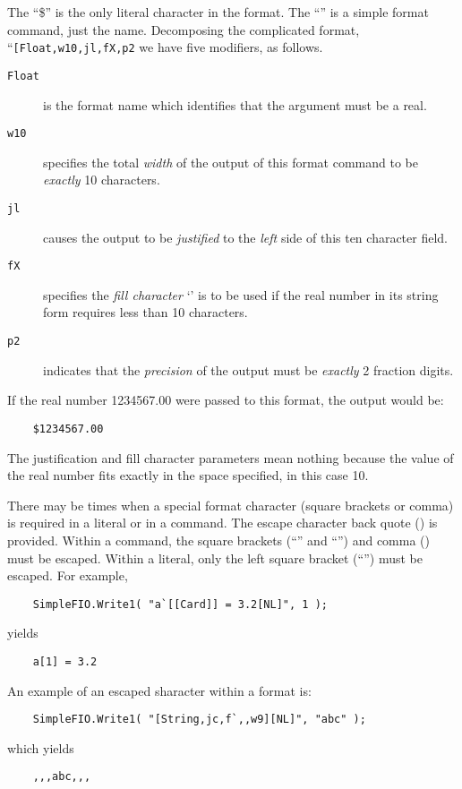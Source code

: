 The ``\$'' is the only literal character in the format.  The ``\code{[NL]}''
is a simple format command, just the name.  Decomposing the complicated format,
``{\tt [Float,w10,jl,fX,p2}
we have five modifiers, as follows.
\begin{description}
\item[{\tt Float}]   is the format name which identifies that the argument
            must be a real.
            
\item[{\tt w10}]    specifies the total {\em width} of the output of this 
            format command to be {\em exactly} 10 characters.
            
\item[{\tt jl}]     causes the output to be {\em justified } to the {\em left}
            side of this ten character field.
            
\item[{\tt fX}]     specifies the {\em fill character} `' is to be
            used if the real number in its string form requires less than
	    10 characters.
            
\item[{\tt p2}]     indicates that the {\em precision} of the output must be
            {\em exactly} 2 fraction digits.
\end{description}           
If the real number 1234567.00 were passed to this format, the output
would be:
\begin{verbatim}
    $1234567.00
\end{verbatim}
The justification and fill character parameters
mean nothing because the value of the real number fits exactly in the
space specified, in this case 10.


There may be times when a special format character (square brackets
or comma) is required in a literal or in a command.  The escape
character back quote () is provided.  Within a command, the
square brackets (``\code{[}'' and ``\code{]}'') and comma (\code{,})
must be escaped.  Within a literal, only the left square bracket (``\code{[}'')
must be escaped.  For example,
\begin{verbatim}
    SimpleFIO.Write1( "a`[[Card]] = 3.2[NL]", 1 );
\end{verbatim}
yields    
\begin{verbatim}
    a[1] = 3.2
\end{verbatim}
An example of an escaped sharacter within a format is:
\begin{verbatim}
    SimpleFIO.Write1( "[String,jc,f`,,w9][NL]", "abc" );
\end{verbatim}
which yields
\begin{verbatim}
    ,,,abc,,,
\end{verbatim}
    

